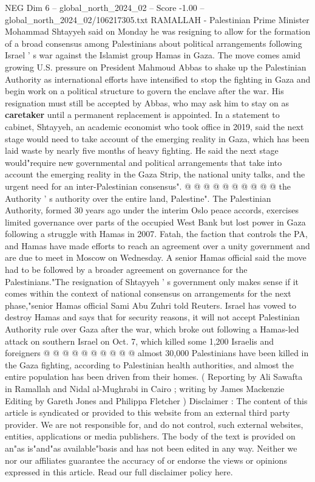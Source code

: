 \begin{textsample}{NEG Dim 6 – global\_north\_2024\_02 – Score -1.00 – global\_north\_2024\_02/106217305.txt}  \label{ex:f6_neg_250}
RAMALLAH - Palestinian Prime Minister Mohammad Shtayyeh said on Monday he was resigning to allow for the formation of a broad consensus among Palestinians about political arrangements following Israel ' s war against the Islamist group Hamas in Gaza.
The move comes amid growing U.S. pressure on President Mahmoud Abbas to shake up the Palestinian Authority as international efforts have intensified to stop the fighting in Gaza and begin work on a political structure to govern the enclave after the war.
His resignation must still be accepted by Abbas, who may ask him to stay on as \textbf{caretaker} until a permanent replacement is appointed.
In a statement to cabinet, Shtayyeh, an academic economist who took office in 2019, said the next stage would need to take account of the emerging reality in Gaza, which has been laid waste by nearly five months of heavy fighting.
He said the next stage would"require new governmental and political arrangements that take into account the emerging reality in the Gaza Strip, the national unity talks, and the urgent need for an inter-Palestinian consensus". @ @ @ @ @ @ @ @ @ @ the Authority ' s authority over the entire land, Palestine".
The Palestinian Authority, formed 30 years ago under the interim Oslo peace accords, exercises limited governance over parts of the occupied West Bank but lost power in Gaza following a struggle with Hamas in 2007.
Fatah, the faction that controls the PA, and Hamas have made efforts to reach an agreement over a unity government and are due to meet in Moscow on Wednesday.
A senior Hamas official said the move had to be followed by a broader agreement on governance for the Palestinians."The resignation of Shtayyeh ' s government only makes sense if it comes within the context of national consensus on arrangements for the next phase,"senior Hamas official Sami Abu Zuhri told Reuters.
Israel has vowed to destroy Hamas and says that for security reasons, it will not accept Palestinian Authority rule over Gaza after the war, which broke out following a Hamas-led attack on southern Israel on Oct. 7, which killed some 1,200 Israelis and foreigners @ @ @ @ @ @ @ @ @ @ almost 30,000 Palestinians have been killed in the Gaza fighting, according to Palestinian health authorities, and almost the entire population has been driven from their homes. ( Reporting by Ali Sawafta in Ramallah and Nidal al-Mughrabi in Cairo ; writing by James Mackenzie Editing by Gareth Jones and Philippa Fletcher ) Disclaimer : The content of this article is syndicated or provided to this website from an external third party provider.
We are not responsible for, and do not control, such external websites, entities, applications or media publishers.
The body of the text is provided on an"as is"and"as available"basis and has not been edited in any way.
Neither we nor our affiliates guarantee the accuracy of or endorse the views or opinions expressed in this article.
Read our full disclaimer policy here.

\end{textsample}
